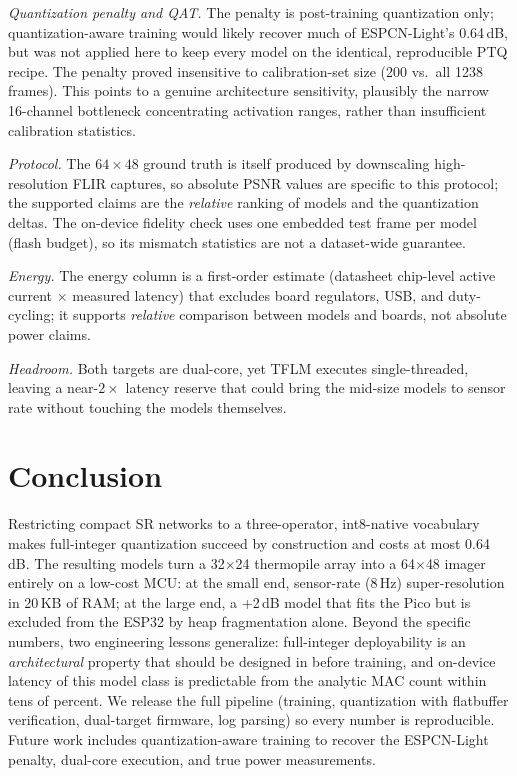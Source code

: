 \documentclass[conference,a4paper]{IEEEtran}
\begin{document}
\emph{Quantization penalty and QAT.} The penalty is post-training
quantization only; quantization-aware training \cite{jacob2018quantization}
would likely recover much of ESPCN-Light's 0.64\,dB, but was not applied
here to keep every model on the identical, reproducible PTQ recipe. The
penalty proved insensitive to calibration-set size (200 vs.\ all 1238
frames). This points to a genuine architecture sensitivity, plausibly the
narrow 16-channel bottleneck concentrating activation ranges, rather than
insufficient calibration statistics.

\emph{Protocol.} The $64{\times}48$ ground truth is itself produced by
downscaling high-resolution FLIR captures, so absolute PSNR values are
specific to this protocol; the supported claims are the \emph{relative}
ranking of models and the quantization deltas. The on-device fidelity check
uses one embedded test frame per model (flash budget), so its mismatch
statistics are not a dataset-wide guarantee.

\emph{Energy.} The energy column is a first-order estimate (datasheet
chip-level active current $\times$ measured latency) that excludes board
regulators, USB, and duty-cycling; it supports \emph{relative} comparison
between models and boards, not absolute power claims.

\emph{Headroom.} Both targets are dual-core, yet TFLM executes
single-threaded, leaving a near-$2\times$ latency reserve that could bring the
mid-size models to sensor rate without touching the models themselves.

\section{Conclusion}
Restricting compact SR networks to a three-operator, int8-native vocabulary
makes full-integer quantization succeed by construction and costs at most
0.64\,dB. The resulting models turn a 32$\times$24 thermopile array into a
64$\times$48 imager entirely on a low-cost MCU: at the small end,
sensor-rate (8\,Hz) super-resolution in 20\,KB of RAM; at the large end, a
+2\,dB model that fits the Pico but is excluded from the ESP32 by heap
fragmentation alone. Beyond the specific numbers, two engineering lessons
generalize: full-integer deployability is an \emph{architectural} property
that should be designed in before training, and on-device latency of this
model class is predictable from the analytic MAC count within tens of
percent. We release the full pipeline (training, quantization with
flatbuffer verification, dual-target firmware, log parsing) so every
number is reproducible. Future work includes quantization-aware training
to recover the ESPCN-Light penalty, dual-core execution, and true power
measurements.


\balance


\end{document}
